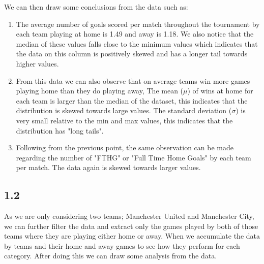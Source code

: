 \documentclass[12pt]{report}
\begin{document}
\noindent
We can then draw some conclusions from the data such as:
\begin{enumerate}
	\item The average number of goals scored per match throughout the tournament by each team playing at home is 1.49 and away is 1.18. We also notice that the median of these values falls close to the minimum values which indicates that the data on this column is positively skewed and has a longer tail towards higher values.
	\item From this data we can also observe that on average teams win more games playing home than they do playing away, The mean ($\mu$) of wins at home for each team is larger than the median of the dataset, this indicates that the distribution is skewed towards large values. The standard deviation ($\sigma$) is very small relative to the min and max values, this indicates that the distribution has "long tails". 
	 \item Following from the previous point, the same observation can be made regarding the number of "FTHG" or "Full Time Home Goals" by each team per match. The data again is skewed towards larger values. 
	 
\end{enumerate}

\subsection{1.2}
\noindent
As we are only considering two teams; Manchester United and Manchester City, we can further filter the data and extract only the games played by both of those teams where they are playing either home or away. When we accumulate the data by teams and their home and away games to see how they perform for each category. After doing this we can draw some analysis from the data.

\vspace{0.3cm}
\noindent

\end{document}

